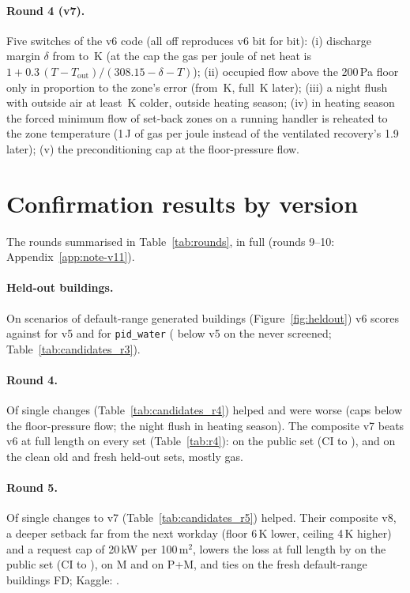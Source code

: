 \documentclass{article}
\begin{document}
\paragraph{Round 4 (v7).}
\label{sec:v7}
Five switches of the v6 code (all off reproduces v6 bit for bit): (i) discharge margin $\delta$ from
\VSixDischMargin{} to \ParRFDischMargin\,K (at the cap the gas per joule of net heat is
$1 + 0.3\,(T - T_{\text{out}})/(308.15 - \delta - T)$); (ii) occupied flow above the 200\,Pa floor only in
proportion to the zone's error (from \ParRFOccEzero\,K, full \ParRFOccSpan\,K later); (iii) a night flush with
outside air at least \ParRFFlushDt\,K colder, outside heating season; (iv) in heating season the forced minimum
flow of set-back zones on a running handler is reheated to the zone temperature (1\,J of gas per joule instead
of the ventilated recovery's 1.9 later); (v) the preconditioning cap at the floor-pressure flow.

\section{Confirmation results by version}
\label{app:rounds}
The rounds summarised in Table~\ref{tab:rounds}, in full (rounds 9--10: Appendix~\ref{app:note-v11}).

\paragraph{Held-out buildings.}
On \NHeldAll{} scenarios of \NHeldAllBuild{} default-range generated buildings (Figure~\ref{fig:heldout}) v6 scores
\HeldAllMetricOurs{} against \HeldAllMetricOursVFive{} for v5 and \HeldAllMetricPidWater{} for \texttt{pid\_water}
(\HeldUnscrVFiveRelRed{} below v5 on the \NHeldUnscr{} never screened; Table~\ref{tab:candidates_r3}).

\paragraph{Round 4.}
Of \RFNSingles{} single changes (Table~\ref{tab:candidates_r4}) \RFNHelps{} helped and \RFNWorse{} were worse (caps
below the floor-pressure flow; the night flush in heating season). The composite v7 beats v6 at full length on every
set (Table~\ref{tab:r4}): \RFConfPubRed{} on the public set (CI \RFConfPubRedLo{} to \RFConfPubRedHi),
\RFConfOldCleanRed{} and \RFConfFreshRed{} on the clean old and fresh held-out sets, mostly gas.

\paragraph{Round 5.}
Of \RFiveNSingles{} single changes to v7 (Table~\ref{tab:candidates_r5}) \RFiveNHelps{} helped. Their composite v8, a
deeper setback far from the next workday (floor 6\,K lower, ceiling 4\,K higher) and a request cap of 20\,kW per
100\,m$^2$, lowers the loss at full length by
\RFiveConfPubRelAbs{} on the public set (CI \RFiveConfPubRelHiAbs{} to \RFiveConfPubRelLoAbs), \RFiveConfMinnRelAbs{} on
M and \RFiveConfPubMinnRelAbs{} on P+M, and ties on the fresh default-range buildings FD; Kaggle: \RFiveKagVEight.
\end{document}

